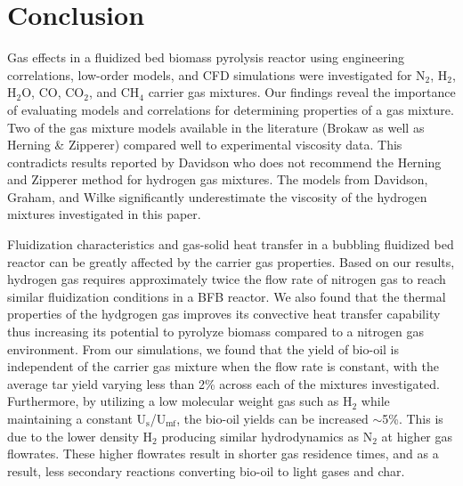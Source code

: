 
\section{Conclusion}

Gas effects in a fluidized bed biomass pyrolysis reactor using engineering correlations, low-order models, and CFD simulations were investigated for N$_2$, H$_2$, H$_2$O, CO, CO$_2$, and CH$_4$ carrier gas mixtures. Our findings reveal the importance of evaluating models and correlations for determining properties of a gas mixture. Two of the gas mixture models available in the literature (Brokaw as well as Herning \& Zipperer) compared well to experimental viscosity data. This contradicts results reported by Davidson who does not recommend the Herning and Zipperer method for hydrogen gas mixtures. The models from Davidson, Graham, and Wilke significantly underestimate the viscosity of the hydrogen mixtures investigated in this paper.

Fluidization characteristics and gas-solid heat transfer in a bubbling fluidized bed reactor can be greatly affected by the carrier gas properties. Based on our results, hydrogen gas requires approximately twice the flow rate of nitrogen gas to reach similar fluidization conditions in a BFB reactor. We also found that the thermal properties of the hydgrogen gas improves its convective heat transfer capability thus increasing its potential to pyrolyze biomass compared to a nitrogen gas environment. From our simulations, we found that the yield of bio-oil is independent of the carrier gas mixture when the flow rate is constant, with the average tar yield varying less than 2\% across each of the mixtures investigated. Furthermore, by utilizing a low molecular weight gas such as H$_2$ while maintaining a constant U$_\text{s}$/U$_\text{mf}$, the bio-oil yields can be increased $\sim$5\%. This is due to the lower density H$_2$ producing similar hydrodynamics as N$_2$ at higher gas flowrates. These higher flowrates result in shorter gas residence times, and as a result, less secondary reactions converting bio-oil to light gases and char.
